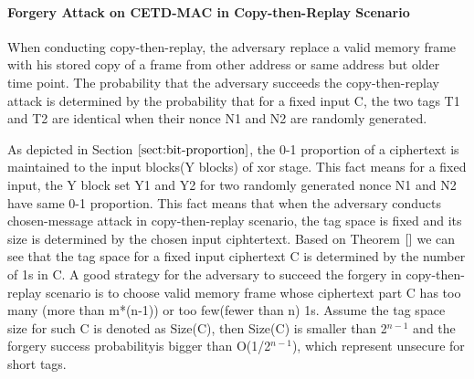 %

\paragraph{Forgery Attack on CETD-MAC in Copy-then-Replay Scenario}
When conducting copy-then-replay, the adversary replace a valid memory frame with his stored copy of a frame from other address or same address but older time point. The probability that the adversary succeeds the copy-then-replay attack is determined by the probability that for a fixed input C, the two tags T1 and T2 are identical when their nonce N1 and N2 are randomly generated.

As depicted in Section $\ref{sect:bit-proportion}$, the 0-1 proportion of a ciphertext is maintained to the input blocks(Y blocks) of xor stage. This fact means for a fixed input, the Y block set Y1 and Y2 for two randomly generated nonce N1 and N2 have same 0-1 proportion. This fact means that when the adversary conducts chosen-message attack in copy-then-replay scenario, the tag space is fixed and its size is determined by the chosen input ciphtertext.  
Based on Theorem $\ref{}$ we can see that the tag space for a fixed input ciphertext C is determined by the number of 1s in C. A good strategy for the adversary to succeed the forgery in copy-then-replay scenario is to choose valid memory frame whose ciphertext part C has too many (more than m*(n-1)) or too few(fewer than n) 1s. Assume the tag space size for such C is denoted as Size(C), then Size(C) is smaller than 2$^{n-1}$ and the forgery success probabilityis bigger than O(1/2$^{n-1}$), which represent unsecure for short tags.


%
